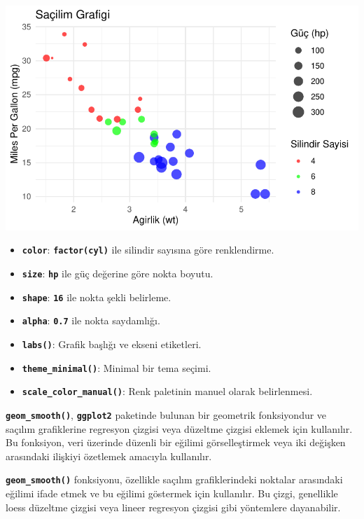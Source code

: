 \documentclass[
  letterpaper,
  DIV=11,
  numbers=noendperiod]{scrreprt}
\begin{document}
\includegraphics{ggplot2_files/figure-pdf/unnamed-chunk-11-1.pdf}

\begin{itemize}
\item
  \textbf{\texttt{color}}: \textbf{\texttt{factor(cyl)}} ile silindir
  sayısına göre renklendirme.
\item
  \textbf{\texttt{size}}: \textbf{\texttt{hp}} ile güç değerine göre
  nokta boyutu.
\item
  \textbf{\texttt{shape}}: \textbf{\texttt{16}} ile nokta şekli
  belirleme.
\item
  \textbf{\texttt{alpha}}: \textbf{\texttt{0.7}} ile nokta saydamlığı.
\item
  \textbf{\texttt{labs()}}: Grafik başlığı ve ekseni etiketleri.
\item
  \textbf{\texttt{theme\_minimal()}}: Minimal bir tema seçimi.
\item
  \textbf{\texttt{scale\_color\_manual()}}: Renk paletinin manuel olarak
  belirlenmesi.
\end{itemize}

\textbf{\texttt{geom\_smooth()}}, \textbf{\texttt{ggplot2}} paketinde
bulunan bir geometrik fonksiyondur ve saçılım grafiklerine regresyon
çizgisi veya düzeltme çizgisi eklemek için kullanılır. Bu fonksiyon,
veri üzerinde düzenli bir eğilimi görselleştirmek veya iki değişken
arasındaki ilişkiyi özetlemek amacıyla kullanılır.

\textbf{\texttt{geom\_smooth()}} fonksiyonu, özellikle saçılım
grafiklerindeki noktalar arasındaki eğilimi ifade etmek ve bu eğilimi
göstermek için kullanılır. Bu çizgi, genellikle loess düzeltme çizgisi
veya lineer regresyon çizgisi gibi yöntemlere dayanabilir.
\end{document}
